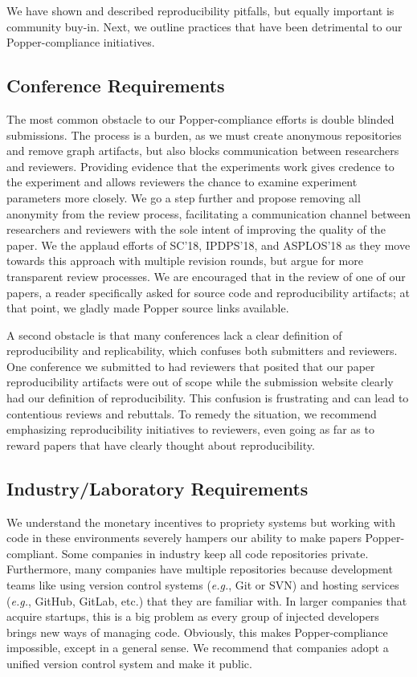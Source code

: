 We have shown and described reproducibility pitfalls, but equally important is
community buy-in. Next, we outline practices that have been detrimental to our
Popper-compliance initiatives.

\subsection{Conference Requirements}

The most common obstacle to our Popper-compliance efforts is double blinded
submissions. The process is a burden, as we must create anonymous repositories
and remove graph artifacts, but also blocks communication between researchers
and reviewers. Providing evidence that the experiments work gives credence to
the experiment and allows reviewers the chance to examine experiment parameters
more closely. We go a step further and propose removing all anonymity from the
review process, facilitating a communication channel between researchers and
reviewers with the sole intent of improving the quality of the paper. We the
applaud efforts of SC'18, IPDPS'18, and ASPLOS'18 as they move towards this
approach with multiple revision rounds, but argue for more transparent review
processes. We are encouraged that in the review of one of our papers, a reader
specifically asked for source code and reproducibility artifacts; at that
point, we gladly made Popper source links available.

A second obstacle is that many conferences lack a clear definition of
reproducibility and replicability, which confuses both submitters and
reviewers. One conference we submitted to had reviewers that posited that
our paper reproducibility artifacts were out of scope while the submission
website clearly had our definition of reproducibility. This confusion is
frustrating and can lead to contentious reviews and rebuttals. To remedy the
situation, we recommend emphasizing reproducibility initiatives to reviewers,
even going as far as to reward papers that have clearly thought about
reproducibility.

\subsection{Industry/Laboratory Requirements}
\label{sec:reqs}

We understand the monetary incentives to propriety systems but working with
code in these environments severely hampers our ability to make papers
Popper-compliant.  Some companies in industry keep all code repositories
private.  Furthermore, many companies have multiple repositories because
development teams like using version control systems ({\it e.g.}, Git or SVN)
and hosting services ({\it e.g.}, GitHub, GitLab, etc.) that they are familiar
with. In larger companies that acquire startups, this is a big problem as every
group of injected developers brings new ways of managing code.  Obviously, this
makes Popper-compliance impossible, except in a general sense.  We recommend
that companies adopt a unified version control system and make it public.

